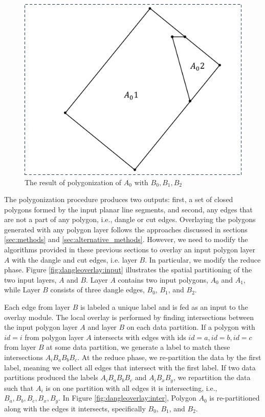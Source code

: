 \begin{figure}[tb]
	\centering
	\includegraphics[width=0.75 \linewidth ]{model/DangleOverlay3.pdf}
	\caption[caption]{The result of polygonization of $A_0$ with $B_0, B_1, B_2$}
	\label{fig:dangleoverlay:result}
\end{figure}


The polygonization procedure produces two outputs: first, a set of closed polygons formed by the input planar line segments, and second, any edges that are not a part of any polygon, i.e., dangle or cut edges. 
Overlaying the polygons generated with any polygon layer follows the approaches discussed in sections \ref{sec:methods} and \ref{sec:alternative_methods}.
However, we need to modify the algorithms provided in these previous sections to overlay an input polygon layer $A$ with the dangle and cut edges, i.e. layer $B$. In particular, we modify the reduce phase.
Figure \ref{fig:dangleoverlay:input} illustrates the spatial partitioning of the two input layers, $A$ and $B$. Layer $A$ contains two input polygons, $A_0$ and $A_1$, while Layer $B$ consists of three dangle edges, $B_0$, $B_1$, and $B_2$.

Each edge from layer $B$ is labeled a unique label and is fed as an input to the overlay module.
The local overlay is performed by finding intersections between the input polygon layer $A$ and layer $B$ on each data partition.
If a polygon with $id = i$ from polygon layer $A$ intersects with edges with ids $id = a, id = b, id = c$ from layer $B$ at some data partition, we generate a label to match these intersections $A_{i} B_{a} B_{b} B_{c}$. 
At the reduce phase, we re-partition the data by the first label, meaning we collect all edges that intersect with the first label.
If two data partitions produced the labels $A_{i} B_{a} B_{b} B_{c}$ and $A_{i} B_{x} B_{y}$, we repartition the data such that $A_{i}$ is on one partition with all edges it is intersecting, i.e., $B_{a}, B_{b}, B_{c}, B_{x}, B_{y}$.
In Figure \ref{fig:dangleoverlay:inter}, Polygon $A_0$ is re-partitioned along with the edges it intersects, specifically $B_0$, $B_1$, and $B_2$.

